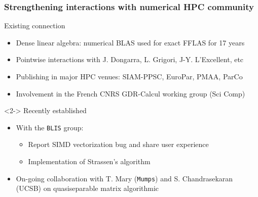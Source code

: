 \documentclass{beamer}
\begin{document}
\begin{frame}
  \frametitle{Strengthening interactions with numerical HPC community}
  \begin{block}  {Existing connection}
    \begin{itemize}
    \item Dense linear algebra: numerical BLAS used for exact FFLAS for 17 years
    \item Pointwise interactions with J. Dongarra, L. Grigori, J-Y. L'Excellent,  etc
    \item Publishing in major HPC venues:
      SIAM-PPSC, EuroPar, PMAA, ParCo
    \item Involvement in the French CNRS GDR-Calcul  working group (Sci Comp)
    \end{itemize}
  \end{block}
  \begin{block}<2->  {Recently established}
    \begin{itemize}
    \item With the \texttt{BLIS} group:
      \begin{itemize}
      \item Report SIMD vectorization bug and share user experience
      \item Implementation of Strassen's algorithm
      \end{itemize}
    \item On-going collaboration with T. Mary (\texttt{Mumps}) and
        S. Chandrasekaran (UCSB) on quasiseparable matrix algorithmic
    \end{itemize}
  \end{block}
\end{frame}
\end{document}
